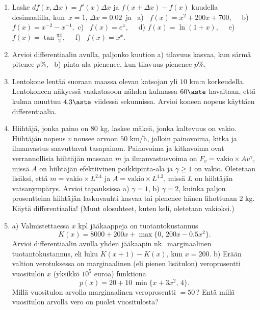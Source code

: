 \Harj
\begin{enumerate}

\item
Laske $df(x,\Delta x)=f'(x)\Delta x$ ja $f(x+\Delta x)-f(x)$ kuudella desimaalilla, kun
$\,x=1$, $\Delta x=0.02\,$ ja \ a) \ $f(x)=x^2+200x+700,\quad$ b) \ $f(x)=x^{-2}-x^{-1},$ 
\newline
c) \ $f(x)=e^x,\quad$ d) $f(x)=\ln(1+x),\quad$ e) \ $f(x)=\tan\tfrac{\pi x}{2},\quad$
f) \ $f(x)=x^x$.

\item
Arvioi differentiaalin avulla, paljonko kuution a) tilavuus kasvaa, kun särmä pitenee $p\%$, \ 
b) pinta-ala pienenee, kun tilavuus pienenee $p\%$.

\item
Lentokone lentää suoraan maassa olevan katsojan yli $10$ km:n korkeudella. Lentokoneen
näkyessä vaakatasoon nähden kulmassa $60\aste$ havaitaan, että kulma muuttuu $4.3\aste$
viidessä sekunnissa. Arvioi koneen nopeus käyttäen differentiaalia.

\item
Hiihtäjä, jonka paino on $80$ kg, laskee mäkeä, jonka kaltevuus on vakio. Hiihtäjän nopeus $v$
nousee arvoon $50$ km/h, jolloin painovoima, kitka ja ilmanvastus saavuttavat tasapainon.
Painovoima ja kitkavoima ovat verrannollisia hiihtäjän massaan $m$ ja ilmanvastusvoima on
$F_v=\text{vakio}\times Av^\gamma$, missä $A$ on hiihtäjän efektiivinen poikkipinta-ala ja 
$\gamma \ge 1$ on vakio. \newline
Oletetaan lisäksi, että $m=\text{vakio}\times L^{2.4}$ ja $A=\text{vakio}\times L^{1.2}$, missä 
$L$ on hiihtäjän vatsanympärys. Arvioi tapauksissa a) $\gamma =1$, b) $\gamma=2$, kuinka paljon
prosentteina hiihtäjän laskuvauhti kasvaa tai pienenee hänen lihottuaan $2$ kg. Käytä 
differentiaalia! (Muut olosuhteet, kuten keli, oletetaan vakioksi.)

\item
a) Valmistettaessa $x$ kpl jääkaappeja on tuotantokustannus
\[
K(x)=8000+200x+\max\{0,\,200x-0.5x^2\}.
\]
Arvioi differentiaalin avulla yhden jääkaapin nk.\ marginaalinen tuotantokustannus, eli luku
$K(x+1)-K(x)$, kun $x=200$. \vspace{1mm}\newline
b) Erään valtion verotuksessa on marginaalinen (eli pienen lisätulon) veroprosentti vuositulon
$x$ (yksikkö $10^5$ euroa) funktiona
\[
p(x)=20+10\,\min\{x+3x^2,\,4\}.
\]
Millä vuositulon arvolla marginaalinen veroprosentti $=50$\,? Entä millä vuositulon arvolla
vero on puolet vuositulosta?


\end{enumerate}

